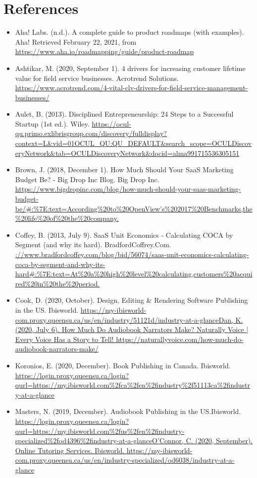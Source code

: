 \documentclass{article}
\begin{document}
    \section{References}
    \begin{itemize}
        \item Aha! Labs. (n.d.). A complete guide to product roadmaps (with examples). Aha! Retrieved February 22, 2021, from \url{https://www.aha.io/roadmapping/guide/product-roadmap}
        \item Ashtikar, M. (2020, September 1). 4 drivers for increasing customer lifetime value for field service businesses. Acrotrend Solutions. \url{https://www.acrotrend.com/4-vital-clv-drivers-for-field-service-management-businesses/}
        \item Aulet, B. (2013). Disciplined Entrepreneurship: 24 Steps to a Successful Startup (1st ed.). Wiley. \url{https://ocul-qu.primo.exlibrisgroup.com/discovery/fulldisplay?context=L&vid=01OCUL_QU:QU_DEFAULT&search_scope=OCULDiscoveryNetwork&tab=OCULDiscoveryNetwork&docid=alma991715536305151}
        \item Brown, J. (2018, December 1). How Much Should Your SaaS Marketing Budget Be? - Big Drop Inc Blog. Big Drop Inc. \url{https://www.bigdropinc.com/blog/how-much-should-your-saas-marketing-budget-be/#:%7E:text=According%20to%20OpenView’s%202017%20Benchmarks,the%20life%20of%20the%20company.}
        \item Coffey, B. (2013, July 9). SaaS Unit Economics - Calculating COCA by Segment (and why its hard). BradfordCoffrey.Com. \url{://www.bradfordcoffey.com/blog/bid/56074/saas-unit-economics-calculating-coca-by-segment-and-why-its-hard#:%7E:text=At%20a%20high%20level%20calculating,customers%20acquired%20in%20the%20period.}
        \item Cook, D. (2020, October). Design, Editing \& Rendering Software Publishing in the US. Ibisworld. \url{https://my-ibisworld-com.proxy.queensu.ca/us/en/industry/51121d/industry-at-a-glanceDan, K. (2020, July 6). How Much Do Audiobook Narrators Make? Naturally Voice | Every Voice Has a Story to Tell! https://naturallyvoice.com/how-much-do-audiobook-narrators-make/}
        \item Koronios, E. (2020, December). Book Publishing in Canada. Ibisworld. \url{https://login.proxy.queensu.ca/login?qurl=https://my.ibisworld.com%2fca%2fen%2findustry%2f51113ca%2findustry-at-a-glance}
        \item Masters, N. (2019, December). Audiobook Publishing in the US.Ibisworld. \url{https://login.proxy.queensu.ca/login?qurl=https://my.ibisworld.com%2fus%2fen%2findustry-specialized%2fod4396%2findustry-at-a-glanceO’Connor, C. (2020, September). Online Tutoring Services. Ibisworld. https://my-ibisworld-com.proxy.queensu.ca/us/en/industry-specialized/od6038/industry-at-a-glance}

\end{itemize}
\end{document}
